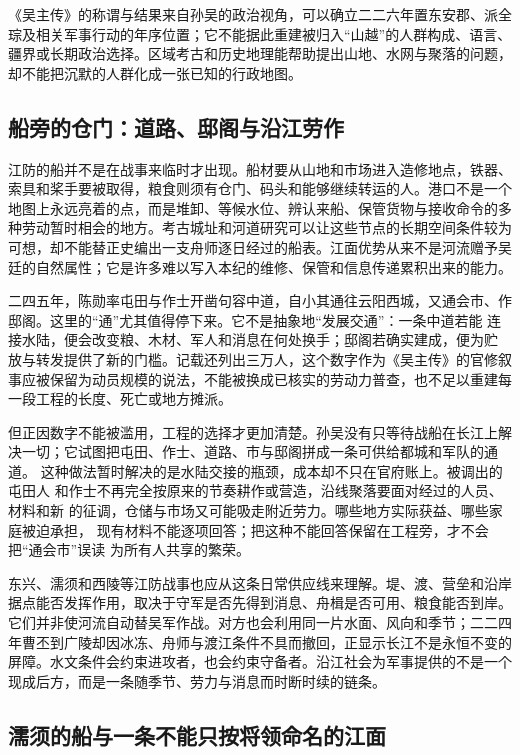\begin{debate}
《吴主传》的称谓与结果来自孙吴的政治视角，可以确立二二六年置东安郡、派全
琮及相关军事行动的年序位置；它不能据此重建被归入“山越”的人群构成、语言、
疆界或长期政治选择。区域考古和历史地理能帮助提出山地、水网与聚落的问题，
却不能把沉默的人群化成一张已知的行政地图。
\end{debate}

\subsection{船旁的仓门：道路、邸阁与沿江劳作}

江防的船并不是在战事来临时才出现。船材要从山地和市场进入造修地点，铁器、
索具和桨手要被取得，粮食则须有仓门、码头和能够继续转运的人。港口不是一个
地图上永远亮着的点，而是堆卸、等候水位、辨认来船、保管货物与接收命令的多
种劳动暂时相会的地方。考古城址和河道研究可以让这些节点的长期空间条件较为
可想，却不能替正史编出一支舟师逐日经过的船表。江面优势从来不是河流赠予吴
廷的自然属性；它是许多难以写入本纪的维修、保管和信息传递累积出来的能力。

二四五年，陈勋率屯田与作士开凿句容中道，自小其通往云阳西城，又通会市、作
邸阁。这里的“通”尤其值得停下来。它不是抽象地“发展交通”：一条中道若能
连接水陆，便会改变粮、木材、军人和消息在何处换手；邸阁若确实建成，便为贮
放与转发提供了新的门槛。记载还列出三万人，这个数字作为《吴主传》的官修叙
事应被保留为动员规模的说法，不能被换成已核实的劳动力普查，也不足以重建每
一段工程的长度、死亡或地方摊派。

但正因数字不能被滥用，工程的选择才更加清楚。孙吴没有只等待战船在长江上解
决一切；它试图把屯田、作士、道路、市与邸阁拼成一条可供给都城和军队的通道。
这种做法暂时解决的是水陆交接的瓶颈，成本却不只在官府账上。被调出的屯田人
和作士不再完全按原来的节奏耕作或营造，沿线聚落要面对经过的人员、材料和新
的征调，仓储与市场又可能吸走附近劳力。哪些地方实际获益、哪些家庭被迫承担，
现有材料不能逐项回答；把这种不能回答保留在工程旁，才不会把“通会市”误读
为所有人共享的繁荣。

东兴、濡须和西陵等江防战事也应从这条日常供应线来理解。堤、渡、营垒和沿岸
据点能否发挥作用，取决于守军是否先得到消息、舟楫是否可用、粮食能否到岸。
它们并非使河流自动替吴军作战。对方也会利用同一片水面、风向和季节；二二四
年曹丕到广陵却因冰冻、舟师与渡江条件不具而撤回，正显示长江不是永恒不变的
屏障。水文条件会约束进攻者，也会约束守备者。沿江社会为军事提供的不是一个
现成后方，而是一条随季节、劳力与消息而时断时续的链条。

\subsection{濡须的船与一条不能只按将领命名的江面}

